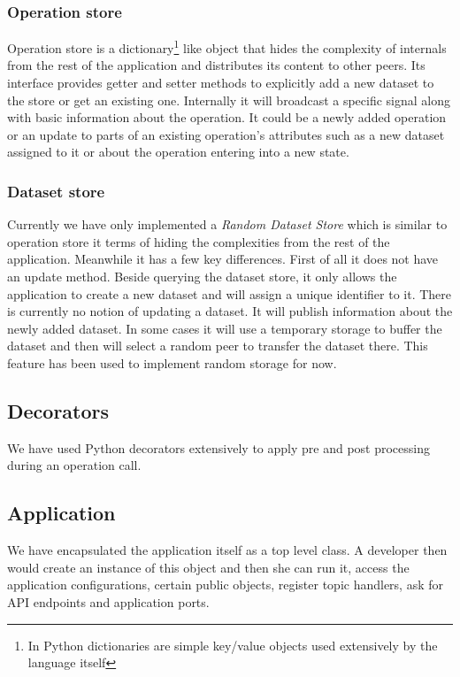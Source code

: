 \subsubsection{Operation store}
Operation store is a dictionary\footnote{In Python dictionaries 
are simple key/value objects used extensively by the language itself} 
like object that hides the complexity of internals from the rest of the application
and distributes its content to other peers.
Its interface provides getter and setter methods to explicitly add a new dataset to the store or
get an existing one.
Internally it will broadcast a specific signal along with basic information about the operation. 
It could be a newly added operation or an update to parts of an existing operation's attributes such as a new dataset assigned
to it or about the operation entering into a new state.

\subsubsection{Dataset store}
Currently we have only implemented a \textit{Random Dataset Store} which is similar to operation store it terms of
hiding the complexities from the rest of the application.
Meanwhile it has a few key differences.
First of all it does not have an update method. 
Beside querying the dataset store, 
it only allows the application to create a new dataset and will assign a unique identifier to it.
There is currently no notion of updating a dataset.
It will publish information about the newly added dataset.
In some cases it will use a temporary storage to buffer the dataset and 
then will select a random peer to transfer the dataset there.
This feature has been used to implement random storage for now.

\subsection{Decorators}
We have used Python decorators extensively to apply pre and post processing during an operation call.

\subsection{Application}
We have encapsulated the application itself as a top level class. 
A developer then would create an instance of this object and then she can run it,
access the application configurations, certain public objects,
register topic handlers, ask for API endpoints and application ports.


